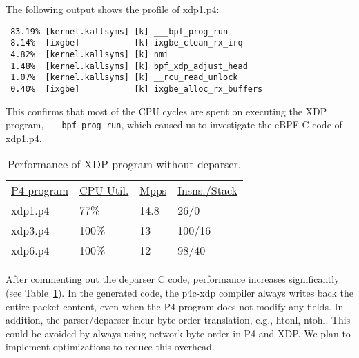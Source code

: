 \noindent The following output shows the profile of xdp1.p4:
{\scriptsize
\begin{verbatim}
 83.19% [kernel.kallsyms] [k] ___bpf_prog_run
 8.14%  [ixgbe]           [k] ixgbe_clean_rx_irq
 4.82%  [kernel.kallsyms] [k] nmi
 1.48%  [kernel.kallsyms] [k] bpf_xdp_adjust_head
 1.07%  [kernel.kallsyms] [k] __rcu_read_unlock
 0.40%  [ixgbe]           [k] ixgbe_alloc_rx_buffers
\end{verbatim}
}

This confirms that most of the CPU cycles are spent on executing the
XDP program, \texttt{\_\_\_bpf\_prog\_run}, which caused us to investigate the
eBPF C code of xdp1.p4.

\begin{table}
\centering
\small
\begin{tabular}{llll}
  \underline{P4 program} & \underline{CPU Util.} & \underline{Mpps} & \underline{Insns./Stack}\\
  xdp1.p4 &  77\% &  14.8 & 26/0 \\
  xdp3.p4 &  100\% &  13 & 100/16 \\
  xdp6.p4 &  100\% &  12 & 98/40 \\
\end{tabular}
\caption{\footnotesize Performance of XDP program without deparser.}
\label{tab:perf2}
\end{table}

After commenting out the deparser C code, performance increases
significantly (see Table~\ref{tab:perf2}).  In the generated
code, the p4c-xdp compiler always writes back the entire packet
content, even when the P4 program does not modify any fields.  In
addition, the parser/deparser incur byte-order translation, e.g.,
htonl, ntohl.  This could be avoided by always using network
byte-order in P4 and XDP.  We plan to implement optimizations to
reduce this overhead.
